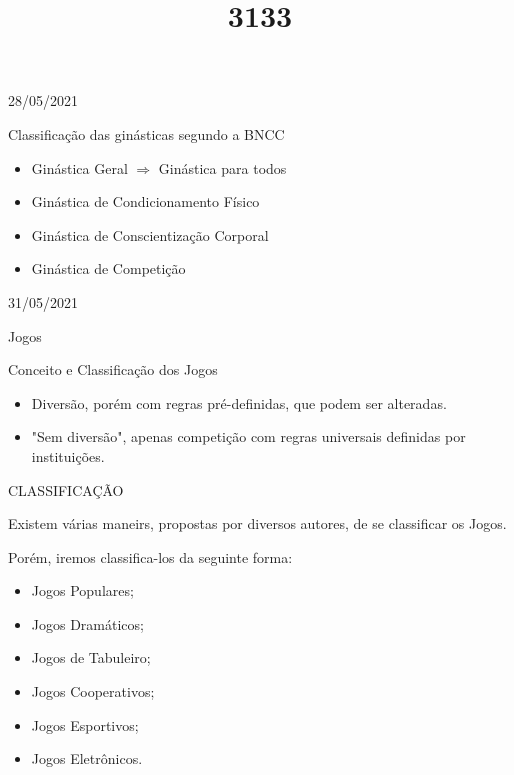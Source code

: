 \documentclass{SchoolBook}
\begin{document}
    \begin{day}{28/05/2021}
        \title{3}{Classificação das ginásticas segundo a BNCC}
        
        \begin{itemize}[nosep]
            \item Ginástica Geral $\Longrightarrow$ Ginástica para todos
            \item Ginástica de Condicionamento Físico
            \item Ginástica de Conscientização Corporal
            \item Ginástica de Competição
        \end{itemize}
    \end{day}
    
    \begin{day}{31/05/2021}
        \title{1}{Jogos}
        \title{3}{Conceito e Classificação dos Jogos}
        
        \begin{itemize}[nosep]
            \item Diversão, porém com regras pré-definidas, que podem ser alteradas.
            \item "Sem diversão", apenas competição com regras universais definidas por instituições.
        \end{itemize}
        
        \title{3}{CLASSIFICAÇÃO}
        
        Existem várias maneirs, propostas por diversos autores, de se classificar os Jogos.
        
        Porém, iremos classifica-los da seguinte forma:
        
        \begin{itemize}[nosep]
            \item Jogos Populares;
            \item Jogos Dramáticos;
            \item Jogos de Tabuleiro;
            \item Jogos Cooperativos;
            \item Jogos Esportivos;
            \item Jogos Eletrônicos.
        \end{itemize}
    \end{day}
\end{document}
